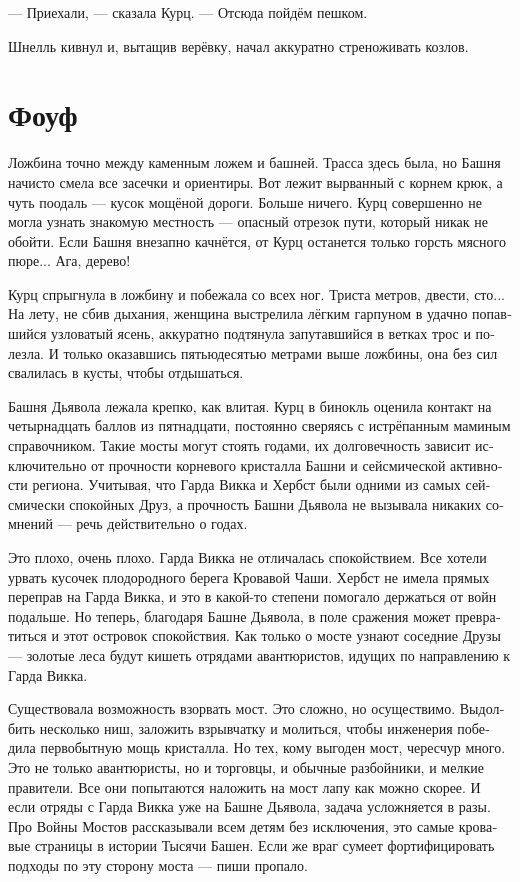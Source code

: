\documentclass[a4paper,10pt,fleqn]{book}\usepackage{polyglossia}\setdefaultlanguage[babelshorthands=true]{russian}\setotherlanguage{english}\defaultfontfeatures{Ligatures=TeX,Mapping=tex-text}\usepackage{xcolor}\newcommand{\ml}[3]{#2}
\begin{document}
--- Приехали, --- сказала Курц.
--- Отсюда пойдём пешком.

Шнелль кивнул и, вытащив верёвку, начал аккуратно стреноживать козлов.

\section{Фоуф}

Ложбина точно между каменным ложем и башней.
Трасса здесь была, но Башня начисто смела все засечки и ориентиры.
Вот лежит вырванный с корнем крюк, а чуть поодаль --- кусок мощёной дороги.
Больше ничего.
Курц совершенно не могла узнать знакомую местность --- опасный отрезок пути, который никак не обойти.
Если Башня внезапно качнётся, от Курц останется только горсть мясного пюре...
Ага, дерево!

Курц спрыгнула в ложбину и побежала со всех ног.
Триста метров, двести, сто...
На лету, не сбив дыхания, женщина выстрелила лёгким гарпуном в удачно попавшийся узловатый ясень, аккуратно подтянула запутавшийся в ветках трос и полезла.
И только оказавшись пятьюдесятью метрами выше ложбины, она без сил свалилась в кусты, чтобы отдышаться.

Башня Дьявола лежала крепко, как влитая.
Курц в бинокль оценила контакт на четырнадцать баллов из пятнадцати, постоянно сверяясь с истрёпанным маминым справочником.
Такие мосты могут стоять годами, их долговечность зависит исключительно от прочности корневого кристалла Башни и сейсмической активности региона.
Учитывая, что Гарда Викка и Хербст были одними из самых сейсмически спокойных Друз, а прочность Башни Дьявола не вызывала никаких сомнений --- речь действительно о годах.

Это плохо, очень плохо.
Гарда Викка не отличалась спокойствием.
Все хотели урвать кусочек плодородного берега Кровавой Чаши.
Хербст не имела прямых переправ на Гарда Викка, и это в какой-то степени помогало держаться от войн подальше.
Но теперь, благодаря Башне Дьявола, в поле сражения может превратиться и этот островок спокойствия.
Как только о мосте узнают соседние Друзы --- золотые леса будут кишеть отрядами авантюристов, идущих по направлению к Гарда Викка.

Существовала возможность взорвать мост.
Это сложно, но осуществимо.
Выдолбить несколько ниш, заложить взрывчатку и молиться, чтобы инженерия победила первобытную мощь кристалла.
Но тех, кому выгоден мост, чересчур много.
Это не только авантюристы, но и торговцы, и обычные разбойники, и мелкие правители.
Все они попытаются наложить на мост лапу как можно скорее.
И если отряды с Гарда Викка уже на Башне Дьявола, задача усложняется в разы.
Про Войны Мостов рассказывали всем детям без исключения, это самые кровавые страницы в истории Тысячи Башен.
Если же враг сумеет фортифицировать подходы по эту сторону моста --- пиши пропало.
\end{document}
